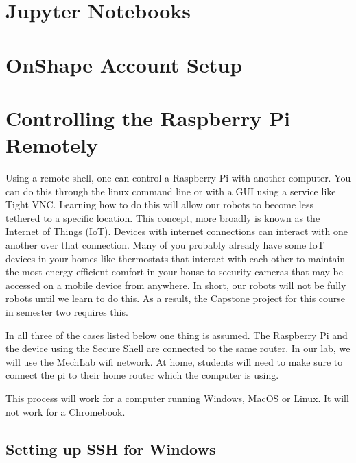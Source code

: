\documentclass[
]{book}
\begin{document}
\hypertarget{jupyter-notebooks}{%
\section{Jupyter Notebooks}\label{jupyter-notebooks}}

\hypertarget{onshape-account-setup}{%
\section{OnShape Account Setup}\label{onshape-account-setup}}

\hypertarget{controlling-the-raspberry-pi-remotely}{%
\section{Controlling the Raspberry Pi Remotely}\label{controlling-the-raspberry-pi-remotely}}

Using a remote shell, one can control a Raspberry Pi with another computer. You can do this through the linux command line or with a GUI using a service like Tight VNC. Learning how to do this will allow our robots to become less tethered to a specific location. This concept, more broadly is known as the Internet of Things (IoT). Devices with internet connections can interact with one another over that connection. Many of you probably already have some IoT devices in your homes like thermostats that interact with each other to maintain the most energy-efficient comfort in your house to security cameras that may be accessed on a mobile device from anywhere. In short, our robots will not be fully robots until we learn to do this. As a result, the Capstone project for this course in semester two requires this.

In all three of the cases listed below one thing is assumed. The Raspberry Pi and the device using the Secure Shell are connected to the same router. In our lab, we will use the MechLab wifi network. At home, students will need to make sure to connect the pi to their home router which the computer is using.

This process will work for a computer running Windows, MacOS or Linux. It will not work for a Chromebook.

\hypertarget{setting-up-ssh-for-windows}{%
\subsection{Setting up SSH for Windows}\label{setting-up-ssh-for-windows}}
\end{document}
